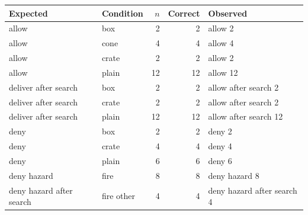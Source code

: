 \begin{tabular}{llrrl}
\toprule
Expected & Condition & $n$ & Correct & Observed \\
\midrule
allow & box & 2 & 2 & allow 2 \\
allow & cone & 4 & 4 & allow 4 \\
allow & crate & 2 & 2 & allow 2 \\
allow & plain & 12 & 12 & allow 12 \\
deliver after search & box & 2 & 2 & allow after search 2 \\
deliver after search & crate & 2 & 2 & allow after search 2 \\
deliver after search & plain & 12 & 12 & allow after search 12 \\
deny & box & 2 & 2 & deny 2 \\
deny & crate & 4 & 4 & deny 4 \\
deny & plain & 6 & 6 & deny 6 \\
deny hazard & fire & 8 & 8 & deny hazard 8 \\
deny hazard after search & fire other & 4 & 4 & deny hazard after search 4 \\
\bottomrule
\end{tabular}
